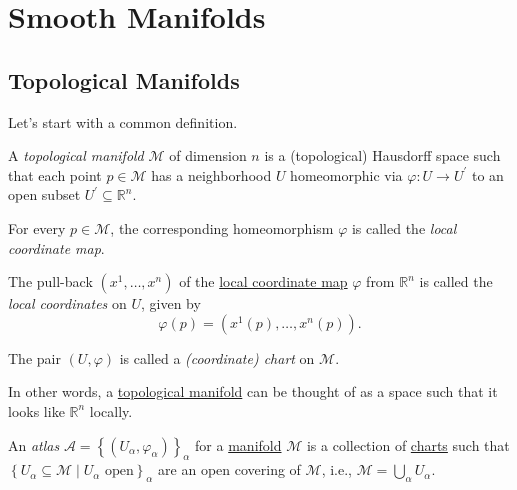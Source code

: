 \chapter{Smooth Manifolds}
\section{Topological Manifolds}
Let's start with a common definition.

\begin{definition}\label{def:topological-manifold}
	A \emph{topological manifold} \(\mathcal{M} \) of dimension \(n\) is a (topological) Hausdorff space such that each point \(p\in \mathcal{M} \) has a neighborhood \(U\) homeomorphic via \(\varphi\colon U \to U^\prime \) to an open subset \(U^\prime \subseteq \mathbb{R} ^n\).
	\begin{definition}\label{def:local-coordinate-map}
		For every \(p\in \mathcal{M} \), the corresponding homeomorphism \(\varphi \) is called the \emph{local coordinate map}.
	\end{definition}
	\begin{definition}\label{def:local-coordinate}
		The pull-back \((x^1, \dots , x^n)\) of the \hyperref[def:local-coordinate-map]{local coordinate map} \(\varphi \) from \(\mathbb{R} ^n\) is called the \emph{local coordinates} on \(U\), given by
		\[
			\varphi (p) = (x^1(p), \dots , x^n(p)).
		\]
	\end{definition}
	\begin{definition}\label{def:coordinate-chart}
		The pair \((U, \varphi )\) is called a \emph{(coordinate) chart} on \(\mathcal{M} \).
	\end{definition}
\end{definition}

In other words, a \hyperref[def:topological-manifold]{topological manifold} can be thought of as a space such that it looks like \(\mathbb{R} ^n\) locally.

\begin{center}
\end{center}

\begin{definition}[Atlas]\label{def:atlas}
	An \emph{atlas} \(\mathcal{A} = \left\{ (U_\alpha , \varphi _\alpha) \right\}_\alpha \) for a \hyperref[def:topological-manifold]{manifold} \(\mathcal{M}\) is a collection of \hyperref[def:coordinate-chart]{charts} such that \(\left\{ U_\alpha\subseteq \mathcal{M} \mid U_\alpha \text{ open} \right\} _\alpha \) are an open covering of \(\mathcal{M} \), i.e., \(\mathcal{M} = \bigcup_{\alpha } U_\alpha \).
\end{definition}

